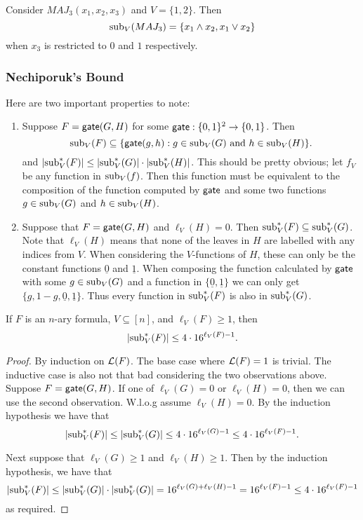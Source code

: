 \documentclass[11pt]{article}
\begin{document}
	\begin{example}
		Consider $MAJ_3(x_1, x_2, x_3)$ and $V = \{1, 2\}$. Then 
		\[\mathrm{sub}_V(MAJ_3) = \{x_1 \land x_2, x_1 \lor x_2\}\]
		when $x_3$ is restricted to $0$ and $1$ respectively. 
	\end{example}
	
	\subsubsection{Nechiporuk's Bound}
	Here are two important properties to note:
	\begin{enumerate}
		\item Suppose $F = \mathsf{gate}(G,H)$ for some $\mathsf{gate}: \{0,1\}^2 \rightarrow \{0,1\}$. Then 
		\[\mathrm{sub}_V(F) \subseteq \{\mathsf{gate}(g, h): g \in \mathrm{sub}_V(G) \mbox{ and } h \in \mathrm{sub}_V(H)\}.\]
		and $|\mathrm{sub}_V^*(F)| \leq |\mathrm{sub}_V^*(G)| \cdot |\mathrm{sub}_V^*(H)|$. This should be pretty obvious; let $f_V$ be any function in $\mathrm{sub}_V(f)$. Then this function must be equivalent to the composition of the function computed by $\mathsf{gate}$ and some two functions $g \in \mathrm{sub}_V(G)$ and $h \in \mathrm{sub}_V(H)$.
		\item Suppose that $F = \mathsf{gate}(G, H)$ and $\ell_V(H) = 0$. Then $\mathrm{sub}_V^*(F) \subseteq \mathrm{sub}_V^*(G)$. Note that $\ell_V(H)$ means that none of the leaves in $H$ are labelled with any indices from $V$. When considering the $V$-functions of $H$, these can only be the constant functions $\underline{0}$ and $\underline{1}$. When composing the function calculated by $\mathsf{gate}$ with some $g \in \mathrm{sub}_V(G)$ and a function in $\{\underline{0}, \underline{1}\}$ we can only get $\{g, 1-g, \underline{0}, \underline{1}\}$. Thus every function in $\mathrm{sub}_V^*(F)$ is also in $\mathrm{sub}_V^{*}(G)$.
	\end{enumerate}
	
	\begin{lemma}
		\label{lem:U-Vsubfunctions}
		If $F$ is an $n$-ary formula, $V \subseteq [n]$, and $\ell_{V}(F) \geq 1$, then \[|\mathrm{sub}_V^*(F)| \leq 4 \cdot 16^{\ell_V(F) - 1}.\] 
	\end{lemma}
	\begin{proof}
		By induction on $\mathcal{L}(F)$. The base case where $\mathcal{L}(F) = 1$ is trivial. The inductive case is also not that bad considering the two observations above. Suppose $F = \mathsf{gate}(G, H)$. If one of $\ell_V(G) = 0$ or $\ell_V(H) = 0$, then we can use the second observation. W.l.o.g assume $\ell_V(H) = 0$. By the induction hypothesis we have that  
		\[|\mathrm{sub}_V^{*}(F)| \leq |\mathrm{sub}_V^*(G)| \leq 4 \cdot 16^{\ell_V(G) - 1} \leq 4 \cdot 16^{\ell_V(F) - 1}.\]
		
		Next suppose that $\ell_V(G) \geq 1$ and $\ell_V(H) \geq 1$. Then by the induction hypothesis, we have that 
		\[|\mathrm{sub}_V^{*}(F)| \leq |\mathrm{sub}_V^*(G)| \cdot |\mathrm{sub}_V^*(G)| = 16^{\ell_V(G) + \ell_V(H) - 1} = 16^{\ell_V(F) - 1}\leq 4 \cdot 16^{\ell_V(F) - 1}\]
		as required.
	\end{proof}
	
\end{document}
